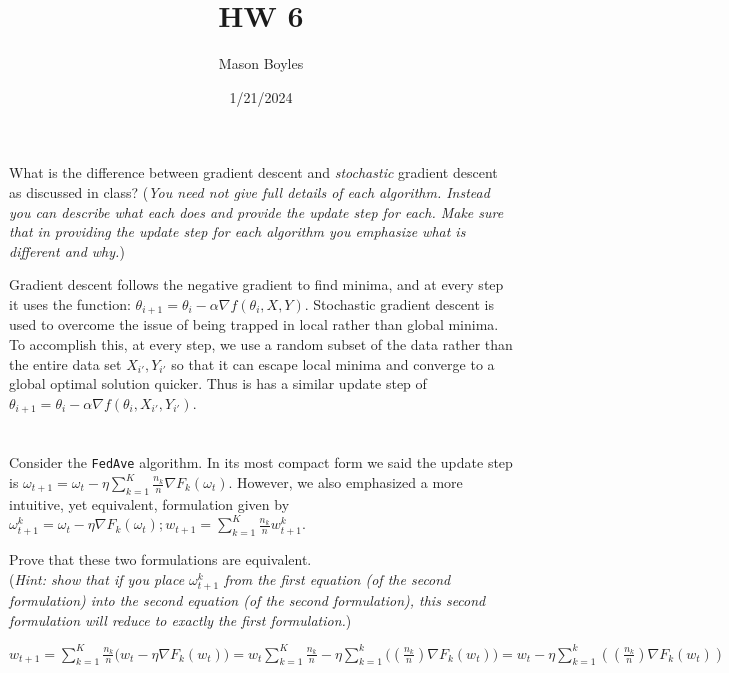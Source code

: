 \documentclass[
]{article}
\title{HW 6}
\author{Mason Boyles}
\date{1/21/2024}
\begin{document}
\maketitle

\hypertarget{section}{%
\section{}\label{section}}

What is the difference between gradient descent and \emph{stochastic}
gradient descent as discussed in class? (\emph{You need not give full
details of each algorithm. Instead you can describe what each does and
provide the update step for each. Make sure that in providing the update
step for each algorithm you emphasize what is different and why.})

Gradient descent follows the negative gradient to find minima, and at
every step it uses the function:
\(\theta_{i+1} = \theta_i - \alpha\nabla f(\theta_i, X, Y)\). Stochastic
gradient descent is used to overcome the issue of being trapped in local
rather than global minima. To accomplish this, at every step, we use a
random subset of the data rather than the entire data set
\(X_{i'}, Y_{i'}\) so that it can escape local minima and converge to a
global optimal solution quicker. Thus is has a similar update step of
\(\theta_{i+1} = \theta_i - \alpha\nabla f(\theta_i, X_{i'}, Y_{i'})\).

\hypertarget{section-1}{%
\section{}\label{section-1}}

Consider the \texttt{FedAve} algorithm. In its most compact form we said
the update step is
\(\omega_{t+1} = \omega_t - \eta \sum_{k=1}^K{\frac{n_k}{n}\nabla F_k(\omega_t)}\).
However, we also emphasized a more intuitive, yet equivalent,
formulation given by
\(\omega_{t+1}^k=\omega_t-\eta\nabla F_k(\omega_t); w_{t+1} = \sum_{k=1}^K{\frac{n_k}{n}w_{t+1}^k}\).

Prove that these two formulations are equivalent.\\
(\emph{Hint: show that if you place \(\omega_{t+1}^k\) from the first
equation (of the second formulation) into the second equation (of the
second formulation), this second formulation will reduce to exactly the
first formulation.})

\(w_{t+1} = \sum_{k=1}^K{\frac{n_k}{n}(w_{t}-\eta\nabla F_k(w_t)}) = w_t\sum_{k=1}^K{\frac{n_k}{n} - \eta\sum_{k=1}^k((\frac{n_k}{n})\nabla F_k(w_t)}) = w_t - \eta\sum_{k=1}^k((\frac{n_k}{n})\nabla F_k(w_t))\)
\end{document}
